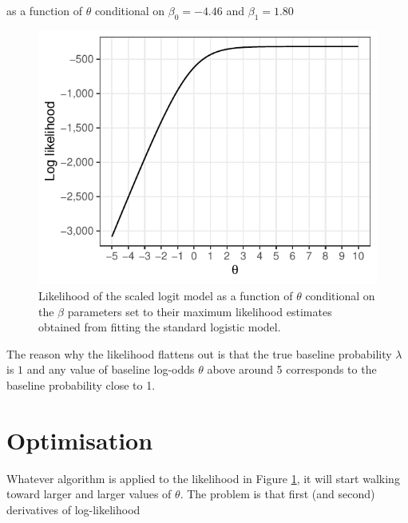 \documentclass[
]{article}
\begin{document}
as a function of \(\theta\) conditional on \(\beta_0 = -4.46\) and \(\beta_1 = 1.80\)

\pagebreak



\begin{figure}

{\centering \includegraphics{graph/theta1} 

}

\caption{Likelihood of the scaled logit model as a function of \(\theta\) conditional on the \(\beta\) parameters set to their maximum likelihood estimates obtained from fitting the standard logistic model.}\label{fig:theta1}
\end{figure}

The reason why the likelihood flattens out is that the true baseline probability \(\lambda\) is \(1\) and any value of baseline log-odds \(\theta\) above around 5 corresponds to the baseline probability close to 1.

\pagebreak

\hypertarget{optimisation}{%
\section{Optimisation}\label{optimisation}}

Whatever algorithm is applied to the likelihood in Figure \ref{fig:theta1}, it will start walking toward larger and larger values of \(\theta\). The problem is that first (and second) derivatives of log-likelihood
\end{document}
